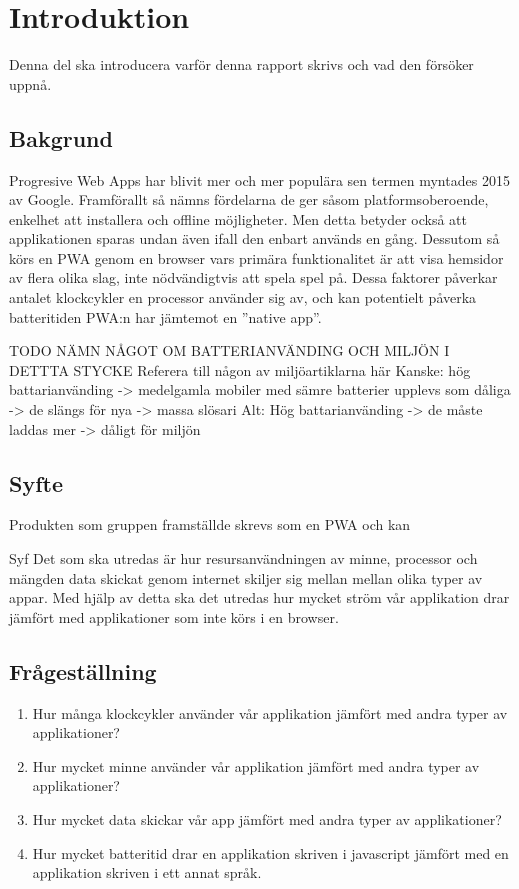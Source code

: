 \section{Introduktion}
\label{sec:joel_a-introduction}
Denna del ska introducera varför denna rapport skrivs och vad den försöker uppnå.

\subsection{Bakgrund}
Progresive Web Apps har blivit mer och mer populära sen termen myntades 2015 av Google. Framförallt så nämns fördelarna de ger såsom platformsoberoende, enkelhet att installera och offline möjligheter. Men detta betyder också att applikationen sparas undan även ifall den enbart används en gång. Dessutom så körs en PWA genom en browser vars primära funktionalitet är att visa hemsidor av flera olika slag, inte nödvändigtvis att spela spel på. Dessa faktorer påverkar antalet klockcykler en processor använder sig av, och kan potentielt påverka batteritiden PWA:n har jämtemot en ''native app''.

TODO NÄMN NÅGOT OM BATTERIANVÄNDING OCH MILJÖN I DETTTA STYCKE
Referera till någon av miljöartiklarna här
Kanske: hög battarianvänding -> medelgamla mobiler med sämre batterier upplevs som dåliga -> de slängs för nya -> massa slösari
Alt: Hög battarianvänding -> de måste laddas mer -> dåligt för miljön

\subsection{Syfte}
Produkten som gruppen framställde skrevs som en PWA och kan 

Syf
Det som ska utredas är hur resursanvändningen av minne, processor och mängden data skickat genom internet skiljer sig mellan mellan olika typer av appar. Med hjälp av detta ska det utredas hur mycket ström vår applikation drar jämfört med applikationer som inte körs i en browser.

\subsection{Frågeställning}
\label{subsec:joel_a-research-questions}

\begin{enumerate}
\item Hur många klockcykler använder vår applikation jämfört med andra typer av applikationer?

\item Hur mycket minne använder vår applikation jämfört med andra typer av applikationer?

\item Hur mycket data skickar vår app jämfört med andra typer av applikationer?

\item Hur mycket batteritid drar en applikation skriven i javascript jämfört med en applikation skriven i ett annat språk.

\end{enumerate}

